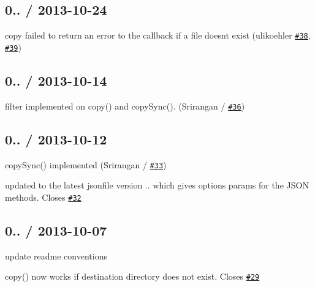 \subsection*{0.. / 2013-\/10-\/24 }


\begin{DoxyItemize}
\item copy failed to return an error to the callback if a file doesn\textquotesingle{}t exist (ulikoehler \href{https://github.com/jprichardson/node-fs-extra/pull/38}{\tt \#38}, \href{https://github.com/jprichardson/node-fs-extra/pull/39}{\tt \#39})
\end{DoxyItemize}

\subsection*{0.. / 2013-\/10-\/14 }


\begin{DoxyItemize}
\item {\ttfamily filter} implemented on {\ttfamily copy()} and {\ttfamily copy\+Sync()}. (Srirangan / \href{https://github.com/jprichardson/node-fs-extra/pull/36}{\tt \#36})
\end{DoxyItemize}

\subsection*{0.. / 2013-\/10-\/12 }


\begin{DoxyItemize}
\item {\ttfamily copy\+Sync()} implemented (Srirangan / \href{https://github.com/jprichardson/node-fs-extra/pull/33}{\tt \#33})
\item updated to the latest {\ttfamily jsonfile} version {..} which gives {\ttfamily options} params for the J\+S\+ON methods. Closes \href{https://github.com/jprichardson/node-fs-extra/issues/32}{\tt \#32}
\end{DoxyItemize}

\subsection*{0.. / 2013-\/10-\/07 }


\begin{DoxyItemize}
\item update readme conventions
\item {\ttfamily copy()} now works if destination directory does not exist. Closes \href{https://github.com/jprichardson/node-fs-extra/issues/29}{\tt \#29}
\end{DoxyItemize}

